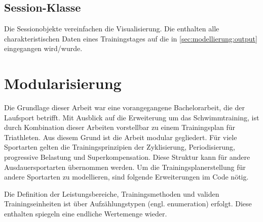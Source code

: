 \subsection{Session-Klasse}
Die Sessionobjekte vereinfachen die Visualisierung. Die enthalten alle charakteristischen Daten eines Trainingstages auf die in \ref{sec:modellierung:output} eingegangen wird/wurde. 

\section{Modularisierung}
Die Grundlage dieser Arbeit war eine vorangegangene Bachelorarbeit, die der Laufsport betrifft. Mit Ausblick auf die Erweiterung um das Schwimmtraining, ist durch Kombination dieser Arbeiten vorstellbar zu einem Trainingsplan für Triathleten. 
Aus diesem Grund ist die Arbeit modular gegliedert.
Für viele Sportarten gelten die Trainingsprinzipien der Zyklisierung, Periodisierung, progressive Belastung und Superkompensation. Diese Struktur kann für andere Ausdauersportarten übernommen werden. Um die Trainingsplanerstellung für andere Sportarten zu modellieren, sind folgende Erweiterungen im Code nötig. \par
Die Definition der Leistungsbereiche, Trainingsmethoden und validen Trainingseinheiten ist über Aufzählungstypen (engl. enumeration) erfolgt. Diese enthalten spiegeln eine endliche Wertemenge wieder.\par

